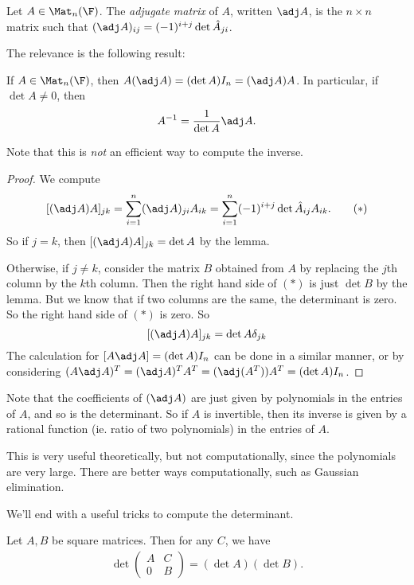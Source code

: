 \documentclass[a4paper]{article}
\begin{document}
\begin{defi}
  Let $A \in \Mat_n(\F)$. The \emph{adjugate matrix} of $A$, written $\adj A$, is the $n\times n$ matrix such that $(\adj A)_{ij} = (-1)^{i + j} \det\hat{A}_{ji}$.
\end{defi}

The relevance is the following result:
\begin{thm}
  If $A \in \Mat_n(\F)$, then $A(\adj A) = (\det A) I_n = (\adj A)A$. In particular, if $\det A \not= 0$, then
  \[
    A^{-1} = \frac{1}{\det A}\adj A.
  \]
\end{thm}
Note that this is \emph{not} an efficient way to compute the inverse.

\begin{proof}
  We compute
  \[
    [(\adj A)A]_{jk} = \sum_{i = 1}^n (\adj A)_{ji} A_{ik} = \sum_{i = 1}^n (-1)^{i + j} \det\hat{A}_{ij} A_{ik}.\tag{$*$}
  \]
  So if $j = k$, then $[(\adj A)A]_{jk} = \det A$ by the lemma.

  Otherwise, if $j \neq k$, consider the matrix $B$ obtained from $A$ by replacing the $j$th column by the $k$th column. Then the right hand side of $(*)$ is just $\det B$ by the lemma. But we know that if two columns are the same, the determinant is zero. So the right hand side of $(*)$ is zero. So
  \[
    [(\adj A)A]_{jk} = \det A \delta_{jk}
  \]
  The calculation for $[A\adj A] = (\det A) I_n$ can be done in a similar manner, or by considering $(A\adj A)^T = (\adj A)^T A^T = (\adj (A^T)) A^T = (\det A) I_n$.
\end{proof}
Note that the coefficients of $(\adj A)$ are just given by polynomials in the entries of $A$, and so is the determinant. So if $A$ is invertible, then its inverse is given by a rational function (ie. ratio of two polynomials) in the entries of $A$.

This is very useful theoretically, but not computationally, since the polynomials are very large. There are better ways computationally, such as Gaussian elimination.

We'll end with a useful tricks to compute the determinant.
\begin{lemma}
  Let $A, B$ be square matrices. Then for any $C$, we have
  \begin{align*}
    \det
    \begin{pmatrix}
      A & C\\
      0 & B
    \end{pmatrix}
    = (\det A) (\det B).
  \end{align*}
\end{lemma}
\end{document}
